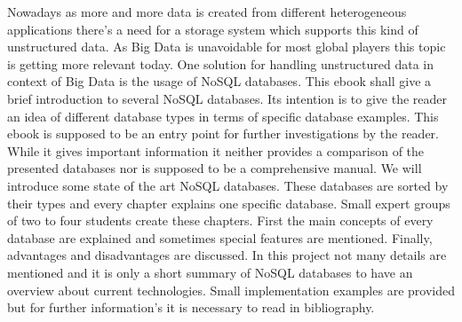Nowadays as more and more data is created from different heterogeneous applications there’s a need for a storage system which supports this kind of unstructured data. As Big Data is unavoidable for most global players this topic is getting more relevant today. One solution for handling unstructured data in context of Big Data is the usage of NoSQL databases. This ebook shall give a brief introduction to several NoSQL databases. Its intention is to give the reader an idea of different database types in terms of specific database examples. This ebook is supposed to be an entry point for further investigations by the reader. While it gives important information it neither provides a comparison of the presented databases nor is supposed to be a comprehensive manual.
We will introduce some state of the art NoSQL databases. These databases are sorted by their types and every chapter explains one specific database. Small expert groups of two to four students create these chapters. First the main concepts of every database are explained and sometimes special features are mentioned. Finally, advantages and disadvantages are discussed.
In this project not many details are mentioned and it is only a short summary of NoSQL databases to have an overview about current technologies. Small implementation examples are provided but for further information’s it is necessary to read in bibliography.
